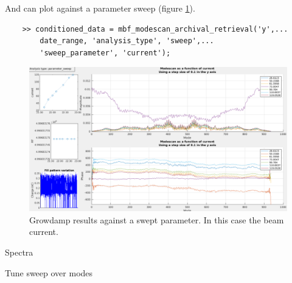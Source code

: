 \documentclass{report}
\begin{document}
And can plot against a parameter sweep  (figure \ref{fig:modescan_parameter_sweep}). 
\begin{verbatim}
    >> conditioned_data = mbf_modescan_archival_retrieval('y',...
        date_range, 'analysis_type', 'sweep',...
        'sweep_parameter', 'current'); 
\end{verbatim}
 \begin{figure}[ht]
     \centering
     \includegraphics[width=1\linewidth]{modescan_parameter_sweep.png}
     \caption{Growdamp results against a swept parameter. In this case the beam current.}
     \label{fig:modescan_parameter_sweep}
 \end{figure}
\clearpage
Spectra 

Tune sweep over modes 
\clearpage
\end{document}
